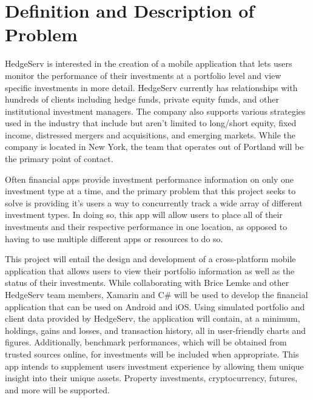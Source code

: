 \documentclass[onecolumn, draftclsnofoot,10pt, compsoc]{IEEEtran}
\begin{document}
\newpage
{}
\tableofcontents
\clearpage

\section{Definition and Description of Problem}

HedgeServ is interested in the creation of a mobile application that lets users monitor the performance of their investments at a portfolio level and view specific investments in more detail. HedgeServ currently has relationships with hundreds of clients including hedge funds, private equity funds, and other institutional investment managers. The company also supports various strategies used in the industry that include but aren’t limited to long/short equity, fixed income, distressed mergers and acquisitions, and emerging markets. While the company is located in New York, the team that operates out of Portland will be the primary point of contact.

Often financial apps provide investment performance information on only one investment type at a time, and the primary problem that this project seeks to solve is providing it's users a way to concurrently track a wide array of different investment types. In doing so, this app will allow users to place all of their investments and their respective performance in one location, as opposed to having to use multiple different apps or resources to do so.

This project will entail the design and development of a cross-platform mobile application that allows users to view their portfolio information as well as the status of their investments. While collaborating with Brice Lemke and other HedgeServ team members, Xamarin and C\# will be used to develop the financial application that can be used on Android and iOS. Using simulated portfolio and client data provided by HedgeServ, the application will contain, at a minimum, holdings, gains and losses, and transaction history, all in user-friendly charts and figures. Additionally, benchmark performances, which will be obtained from trusted sources online, for investments will be included when appropriate. This app intends to supplement users investment experience by allowing them unique insight into their unique assets. Property investments, cryptocurrency, futures, and more will be supported.
\end{document}
